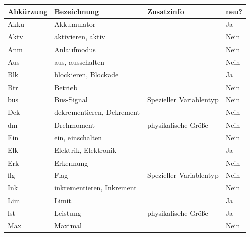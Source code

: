 \begin{longtable}{|l|l|l|l|}
\hline
\rowcolor[HTML]{C0C0C0} 
\textbf{Abkürzung} & \textbf{Bezeichnung}         & \textbf{Zusatzinfo}    & \textbf{neu?} \\ \hline
\endfirsthead
%
\endhead
%
Akku               & Akkumulator                  &                         & Ja            \\ \hline
Aktv               & aktivieren, aktiv            &                         & Nein          \\ \hline
Anm                & Anlaufmodus                  &                         & Nein          \\ \hline
Aus                & aus, ausschalten             &                         & Nein          \\ \hline
Blk                & blockieren, Blockade         &                         & Ja            \\ \hline
Btr                & Betrieb                      &                         & Nein          \\ \hline
bus                & Bus-Signal                   & Spezieller Variablentyp & Nein          \\ \hline
Dek                & dekrementieren, Dekrement    &                         & Nein          \\ \hline
dm                 & Drehmoment                   & physikalische Größe     & Nein          \\ \hline
Ein                & ein, einschalten             &                         & Nein          \\ \hline
Elk                & Elektrik, Elektronik         &                         & Ja            \\ \hline
Erk                & Erkennung                    &                         & Nein          \\ \hline
flg                & Flag                         & Spezieller Variablentyp & Nein          \\ \hline
Ink                & inkrementieren, Inkrement    &                         & Nein          \\ \hline
Lim                & Limit                        &                         & Ja            \\ \hline
lst                & Leistung                     & physikalische Größe     & Ja            \\ \hline
Max                & Maximal                      &                         & Nein          \\ \hline

\end{longtable}
